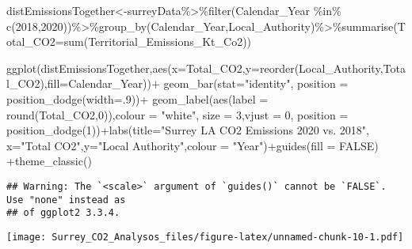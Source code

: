 \documentclass[
]{article}
\newenvironment{Shaded}{\begin{snugshade}}{\end{snugshade}}
\newcommand{\AttributeTok}[1]{\textcolor[rgb]{0.77,0.63,0.00}{#1}}
\newcommand{\ConstantTok}[1]{\textcolor[rgb]{0.00,0.00,0.00}{#1}}
\newcommand{\DecValTok}[1]{\textcolor[rgb]{0.00,0.00,0.81}{#1}}
\newcommand{\FunctionTok}[1]{\textcolor[rgb]{0.00,0.00,0.00}{#1}}
\newcommand{\NormalTok}[1]{#1}
\newcommand{\OtherTok}[1]{\textcolor[rgb]{0.56,0.35,0.01}{#1}}
\newcommand{\SpecialCharTok}[1]{\textcolor[rgb]{0.00,0.00,0.00}{#1}}
\newcommand{\StringTok}[1]{\textcolor[rgb]{0.31,0.60,0.02}{#1}}
\begin{document}
\begin{Shaded}
\begin{Highlighting}[]
\NormalTok{distEmissionsTogether}\OtherTok{\textless{}{-}}\NormalTok{surreyData}\SpecialCharTok{\%\textgreater{}\%}\FunctionTok{filter}\NormalTok{(Calendar\_Year }\SpecialCharTok{\%in\%} \FunctionTok{c}\NormalTok{(}\DecValTok{2018}\NormalTok{,}\DecValTok{2020}\NormalTok{))}\SpecialCharTok{\%\textgreater{}\%}\FunctionTok{group\_by}\NormalTok{(Calendar\_Year,Local\_Authority)}\SpecialCharTok{\%\textgreater{}\%}\FunctionTok{summarise}\NormalTok{(}\AttributeTok{Total\_CO2=}\FunctionTok{sum}\NormalTok{(Territorial\_Emissions\_Kt\_Co2))}


\FunctionTok{ggplot}\NormalTok{(distEmissionsTogether,}\FunctionTok{aes}\NormalTok{(}\AttributeTok{x=}\NormalTok{Total\_CO2,}\AttributeTok{y=}\FunctionTok{reorder}\NormalTok{(Local\_Authority,Total\_CO2),}\AttributeTok{fill=}\NormalTok{Calendar\_Year))}\SpecialCharTok{+}
   \FunctionTok{geom\_bar}\NormalTok{(}\AttributeTok{stat=}\StringTok{"identity"}\NormalTok{, }\AttributeTok{position =} \FunctionTok{position\_dodge}\NormalTok{(}\AttributeTok{width=}\NormalTok{.}\DecValTok{9}\NormalTok{))}\SpecialCharTok{+} 
  \FunctionTok{geom\_label}\NormalTok{(}\FunctionTok{aes}\NormalTok{(}\AttributeTok{label =} \FunctionTok{round}\NormalTok{(Total\_CO2,}\DecValTok{0}\NormalTok{)),}\AttributeTok{colour =} \StringTok{"white"}\NormalTok{, }\AttributeTok{size =} \DecValTok{3}\NormalTok{,}\AttributeTok{vjust =} \DecValTok{0}\NormalTok{, }\AttributeTok{position =} \FunctionTok{position\_dodge}\NormalTok{(}\DecValTok{1}\NormalTok{))}\SpecialCharTok{+}\FunctionTok{labs}\NormalTok{(}\AttributeTok{title=}\StringTok{"Surrey LA CO2 Emissions 2020 vs. 2018"}\NormalTok{, }\AttributeTok{x=}\StringTok{"Total CO2"}\NormalTok{,}\AttributeTok{y=}\StringTok{"Local Authority"}\NormalTok{,}\AttributeTok{colour =} \StringTok{"Year"}\NormalTok{)}\SpecialCharTok{+}\FunctionTok{guides}\NormalTok{(}\AttributeTok{fill =} \ConstantTok{FALSE}\NormalTok{) }\SpecialCharTok{+}\FunctionTok{theme\_classic}\NormalTok{()}
\end{Highlighting}
\end{Shaded}

\begin{verbatim}
## Warning: The `<scale>` argument of `guides()` cannot be `FALSE`. Use "none" instead as
## of ggplot2 3.3.4.
\end{verbatim}

\texttt{[image: Surrey\_CO2\_Analysos\_files/figure-latex/unnamed-chunk-10-1.pdf]}
\end{document}
